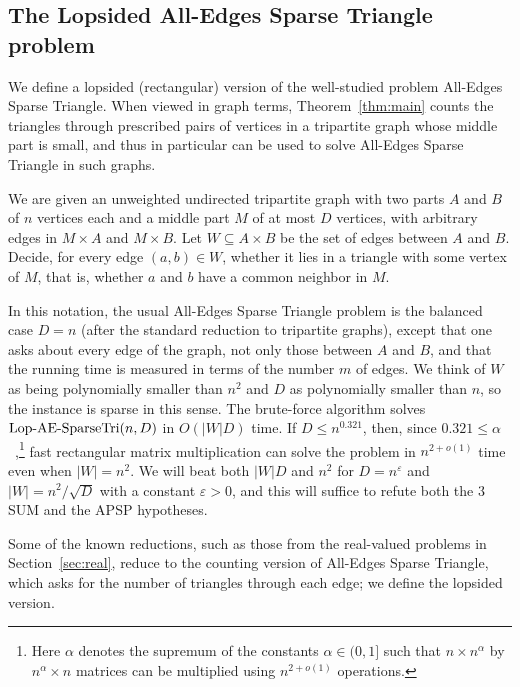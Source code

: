 \subsection{The Lopsided All-Edges Sparse Triangle problem}\label{sec:tri}

We define a lopsided (rectangular) version of the well-studied problem All-Edges Sparse Triangle.
When viewed in graph terms, Theorem~\ref{thm:main} counts the triangles through prescribed pairs of vertices in a tripartite graph whose middle part is small, and thus in particular can be used to solve All-Edges Sparse Triangle in such graphs.


\begin{definition}\label{def:lop}
We are given an unweighted undirected tripartite graph with two parts $A$ and $B$ of $n$ vertices each and a middle part $M$ of at most $D$ vertices, with arbitrary edges in $M\times A$ and $M\times B$. Let $W\subseteq A\times B$ be the set of edges between $A$ and $B$. Decide, for every edge $(a,b)\in W$, whether it lies in a triangle with some vertex of $M$, that is, whether $a$ and $b$ have a common neighbor in $M$.
\end{definition}

In this notation, the usual All-Edges Sparse Triangle problem is the balanced case $D=n$ (after the standard reduction to tripartite graphs), except that one asks about every edge of the graph, not only those between $A$ and $B$, and that the running time is measured in terms of the number $m$ of edges. We think of $W$ as being polynomially smaller than $n^2$ and $D$ as polynomially smaller than $n$, so the instance is sparse in this sense. The brute-force algorithm solves $\mathrm{Lop}\text{-}\mathrm{AE}\text{-}\mathrm{SparseTri}(n,D)$ in $O(|W|D)$ time. If $D\leq n^{0.321}$, then, since $0.321\le\alpha$~\cite{VXXZ24},\footnote{Here $\alpha$ denotes the supremum of the constants $\alpha\in(0,1]$ such that $n\times n^\alpha$ by $n^\alpha\times n$ matrices can be multiplied using $n^{2+o(1)}$ operations.} fast rectangular matrix multiplication can solve the problem in $n^{2+o(1)}$ time even when $|W|=n^2$. We will beat both $|W|D$ and $n^2$ for $D=n^{\varepsilon}$ and $|W|=n^2/\sqrt D$ with a constant $\varepsilon>0$, and this will suffice to refute both the $3$SUM and the APSP hypotheses.

Some of the known reductions, such as those from the real-valued problems in Section~\ref{sec:real}, reduce to the counting version of All-Edges Sparse Triangle, which asks for the number of triangles through each edge; we define the lopsided version.

